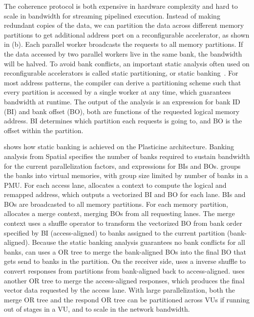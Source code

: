 The coherence protocol is both expensive in hardware complexity and hard to scale in bandwidth for
streaming pipelined execution.
Instead of making redundant copies of the data, we can partition the data across different memory
partitions to get additional address port on a reconfigurable accelerator, as shown in
 (b).
Each parallel worker broadcasts the requests to all memory partitions.
If the data accessed by two parallel workers live in the same bank, the bandwidth will be halved.
To avoid bank conflicts, an important static analysis often used on reconfigurable accelerators 
is called static partitioning, or static banking~\cite{poly_cong}.
For most address patterns, the compiler can derive a partitioning scheme such that every partition is accessed by a
single worker at any time, which guarantees bandwidth at runtime.
The output of the analysis is an expression for bank ID (BI) and bank offset (BO), both are
functions of the requested logical memory address.
BI determines which partition each requests is going to, and BO is the offset within the
partition.

 shows how static banking is achieved on the Plasticine architecture.
Banking analysis from Spatial specifies the number of banks required to sustain bandwidth for the
current parallelization factors, and expressions for BIs and BOs. 
\name groups the banks into virtual memories, with group size limited by number of banks in a PMU.
For each access lane, \name allocates a context to compute the logical and remapped address, which
outputs a vectorized BI and BO for each lane. BIs and BOs are broadcasted to all memory partitions.
For each memory partition, \name allocates a merge context, merging BOs from all requesting lanes.
The merge context uses a shuffle operator to transform the vectorized BO from bank order specified by BI
(access-aligned) to banks assigned to the current partition (bank-aligned).
Because the static banking analysis guarantees no bank conflicts for all banks,
\name can uses a OR tree to merge the bank-aligned BOs into the final BO that gets send to
banks in the partition. On the receiver side, \name uses a inverse shuffle to convert responses from
partitions from bank-aligned back to access-aligned.
\name uses another OR tree to merge the access-aligned responses, which produces the final vector data requested
by the access lane.
With large parallelization, both the merge OR tree and the respond OR tree can be
partitioned across VUs if running out of stages in a VU, and to scale in the network bandwidth.

